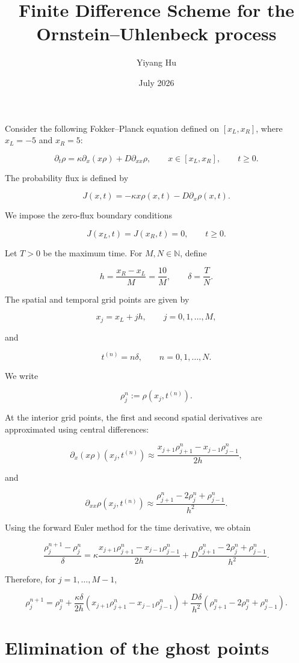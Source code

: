 \documentclass{article}
\title{Finite Difference Scheme for the Ornstein–Uhlenbeck process}
\author{Yiyang Hu}
\date{July 2026}
\begin{document}
\maketitle


\noindent Consider the following Fokker--Planck equation defined on
$[x_L,x_R]$, where $x_L=-5$ and $x_R=5$:

$$
\partial_t\rho
=
\kappa\partial_x(x\rho)
+
D\partial_{xx}\rho,
\qquad
x\in[x_L,x_R],
\qquad
t\geq 0.
$$

The probability flux is defined by

$$
J(x,t)
=
-\kappa x\rho(x,t)
-
D\partial_x\rho(x,t).
$$

We impose the zero-flux boundary conditions

$$
J(x_L,t)=J(x_R,t)=0,
\qquad
t\geq 0.
$$

Let $T>0$ be the maximum time. For $M,N\in\mathbb{N}$, define

$$
h=\frac{x_R-x_L}{M}
=
\frac{10}{M},
\qquad
\delta=\frac{T}{N}.
$$

The spatial and temporal grid points are given by

$$
x_j=x_L+jh,
\qquad
j=0,1,\ldots,M,
$$

and

$$
t^{(n)}=n\delta,
\qquad
n=0,1,\ldots,N.
$$

We write

$$
\rho_j^n
:=
\rho(x_j,t^{(n)}).
$$

At the interior grid points, the first and second spatial derivatives
are approximated using central differences:

$$
\partial_x(x\rho)(x_j,t^{(n)})
\approx
\frac{x_{j+1}\rho_{j+1}^n-x_{j-1}\rho_{j-1}^n}{2h},
$$

and

$$
\partial_{xx}\rho(x_j,t^{(n)})
\approx
\frac{\rho_{j+1}^n-2\rho_j^n+\rho_{j-1}^n}{h^2}.
$$

Using the forward Euler method for the time derivative, we obtain

$$
\frac{\rho_j^{n+1}-\rho_j^n}{\delta}
=
\kappa
\frac{x_{j+1}\rho_{j+1}^n-x_{j-1}\rho_{j-1}^n}{2h}
+
D
\frac{\rho_{j+1}^n-2\rho_j^n+\rho_{j-1}^n}{h^2}.
$$

Therefore, for $j=1,\ldots,M-1$,

$$
\rho_j^{n+1}
=
\rho_j^n
+
\frac{\kappa\delta}{2h}
\left(
x_{j+1}\rho_{j+1}^n
-
x_{j-1}\rho_{j-1}^n
\right)
+
\frac{D\delta}{h^2}
\left(
\rho_{j+1}^n
-
2\rho_j^n
+
\rho_{j-1}^n
\right).
$$

\section*{Elimination of the ghost points}
\end{document}
